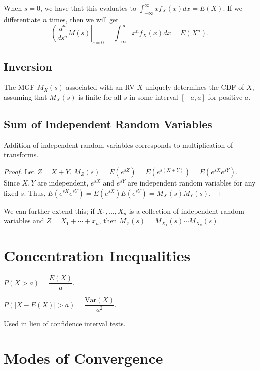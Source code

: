 \documentclass{article}
\newcommand{\Var}{\mathrm{Var}}
\begin{document}
When $s = 0$, we have that this evaluates to $\int_{-\infty}^\infty xf_X(x) dx = E(X)$. If we differentiate $n$ times, then we will get \[\left(\frac{d^n}{ds^n} M(s)\right|_{s = 0} = \int_{-\infty}^{\infty} x^n f_X(x) dx = E(X^n).\]

\subsection{Inversion}
\begin{proposition}
    The MGF $M_X(s)$ associated with an RV $X$ uniquely determines the CDF of $X$, assuming that $M_X(s)$ is finite for all $s$ in some interval $[-a, a]$ for positive $a$. 
\end{proposition}

\subsection{Sum of Independent Random Variables}
\begin{proposition}
    Addition of independent random variables corresponds to multiplication of transforms. 
\end{proposition}

\begin{proof}
    Let $Z = X + Y$. $M_Z(s) = E(e^{sZ}) = E(e^{s(X+Y)}) = E(e^{sX}e^{sY}).$ Since $X, Y$ are independent, $e^{sX}$ and $e^{sY}$ are independent random variables for any fixed $s$. Thus, $E(e^{sX}e^{sY}) = E(e^{sX}) E(e^{sY}) = M_X(s)M_Y(s)$.
\end{proof}

We can further extend this; if $X_1, \ldots, X_n$ is a collection of independent random variables and $Z = X_1 + \cdots + x_n$, then $M_Z(s) = M_{X_1}(s) \cdots M_{X_n}(s)$. 

\section{Concentration Inequalities}
\begin{theorem}
	$P(X > a) = \dfrac{E(X)}{a}$.
\end{theorem}

\begin{theorem}
	$P(|X - E(X)| > a) = \dfrac{\Var(X)}{a^2}$.
\end{theorem}

Used in lieu of confidence interval tests. 

\section{Modes of Convergence}
\end{document}
